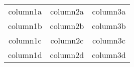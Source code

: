 \documentclass{report}
\begin{document}
\begin{tabular}{c:cc}
	column1a & column2a & column3a \\
	column1b & column2b & column3b \\ \hdashline
	column1c & column2c & column3c \\ 
	column1d & column2d & column3d \\
\end{tabular}
\end{document}
